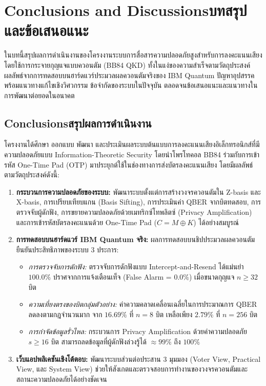 \chapter{\ifenglish Conclusions and Discussions\else บทสรุปและข้อเสนอแนะ\fi}

ในบทนี้สรุปผลการดำเนินงานของโครงงานระบบการสื่อสารความปลอดภัยสูงสำหรับการลงคะแนนเสียงโดยใช้การกระจายกุญแจแบบควอนตัม (BB84 QKD) ทั้งในแง่ของความสำเร็จตามวัตถุประสงค์ ผลลัพธ์จากการทดสอบบนฮาร์ดแวร์ประมวลผลควอนตัมจริงของ IBM Quantum ปัญหาอุปสรรคพร้อมแนวทางแก้ไขเชิงวิศวกรรม ข้อจำกัดของระบบในปัจจุบัน ตลอดจนข้อเสนอแนะและแนวทางในการพัฒนาต่อยอดในอนาคต

\section{\ifenglish Conclusions\else สรุปผลการดำเนินงาน\fi}

โครงงานได้ศึกษา ออกแบบ พัฒนา และประเมินผลระบบต้นแบบการลงคะแนนเสียงอิเล็กทรอนิกส์ที่มีความปลอดภัยแบบ Information-Theoretic Security โดยนำโพรโทคอล BB84 ร่วมกับการเข้ารหัส One-Time Pad (OTP) มาประยุกต์ใช้ในช่องทางการส่งบัตรลงคะแนนเสียง โดยมีผลลัพธ์ตามวัตถุประสงค์ดังนี้:

\begin{enumerate}
    \item \textbf{กระบวนการความปลอดภัยของระบบ:} พัฒนาระบบตั้งแต่การสร้างวงจรควอนตัมใน Z-basis และ X-basis, การเปรียบเทียบแกน (Basis Sifting), การประเมินค่า QBER จากบิตทดสอบ, การตรวจจับผู้ดักฟัง, การขยายความปลอดภัยด้วยเมทริกซ์โทพลิตซ์ (Privacy Amplification) และการเข้ารหัสบัตรลงคะแนนด้วย One-Time Pad ($C = M \oplus K$) ได้อย่างสมบูรณ์
    \item \textbf{การทดสอบบนฮาร์ดแวร์ IBM Quantum จริง:} ผลการทดสอบบนชิปประมวลผลควอนตัมยืนยันประสิทธิภาพของระบบ 3 ประการ:
    \begin{itemize}
        \item \textit{การตรวจจับการดักฟัง:} ตรวจจับการดักฟังแบบ Intercept-and-Resend ได้แม่นยำ $100.0\%$ ปราศจากการแจ้งเตือนเท็จ (False Alarm = $0.0\%$) เมื่อขนาดกุญแจ $n \ge 32$ บิต
        \item \textit{ความเที่ยงตรงของบิตกลุ่มตัวอย่าง:} ค่าความคลาดเคลื่อนเฉลี่ยในการประมาณการ QBER ลดลงตามกฎจำนวนมาก จาก $16.69\%$ ที่ $n = 8$ บิต เหลือเพียง $2.79\%$ ที่ $n = 256$ บิต
        \item \textit{การกำจัดข้อมูลรั่วไหล:} กระบวนการ Privacy Amplification ด้วยค่าความปลอดภัย $s \ge 16$ บิต สามารถลดข้อมูลที่ผู้ดักฟังล่วงรู้ได้ $\approx 99\%$ ถึง $100\%$
    \end{itemize}

    \item \textbf{เว็บแอปพลิเคชันเชิงโต้ตอบ:} พัฒนาระบบส่วนต่อประสาน 3 มุมมอง (Voter View, Practical View, และ System View) ช่วยให้สังเกตและตรวจสอบการทำงานของวงจรควอนตัมและสถานะความปลอดภัยได้อย่างชัดเจน
\end{enumerate}


